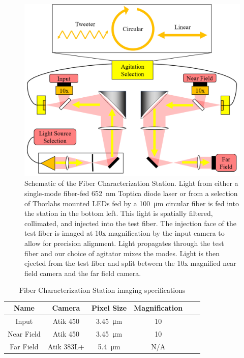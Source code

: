 \documentclass[twocolumn]{emulateapj}
\begin{document}
\begin{figure}
\centering
	\includegraphics[width=\columnwidth]{images/fcs_schematic.png}
	\caption{Schematic of the Fiber Characterization Station. Light from either a single-mode fiber-fed \SI{652}{\nano\meter} Toptica diode laser or from a selection of Thorlabs mounted LEDs fed by a \SI{100}{\micro\meter} circular fiber is fed into the station in the bottom left. This light is spatially filtered, collimated, and injected into the test fiber. The injection face of the test fiber is imaged at 10x magnification by the input camera to allow for precision alignment. Light propagates through the test fiber and our choice of agitator mixes the modes. Light is then ejected from the test fiber and split between the 10x magnified near field camera and the far field camera.}
\label{fig:fcs}
\end{figure}

\begin{table}
\centering
\caption{Fiber Characterization Station imaging specifications}
	\begin{tabular}{cccccc}
	\hline
	Name & Camera & Pixel Size & Magnification \\
	\hline \hline
	Input & Atik 450 & \SI{3.45}{\micro\meter} & 10 \\
	\hline
	Near Field & Atik 450 & \SI{3.45}{\micro\meter} & 10 \\
	\hline
	Far Field & Atik 383L+ & \SI{5.4}{\micro\meter} & N/A \\
	\hline	
	\end{tabular}
\label{table:cameras}
\end{table}
\end{document}
